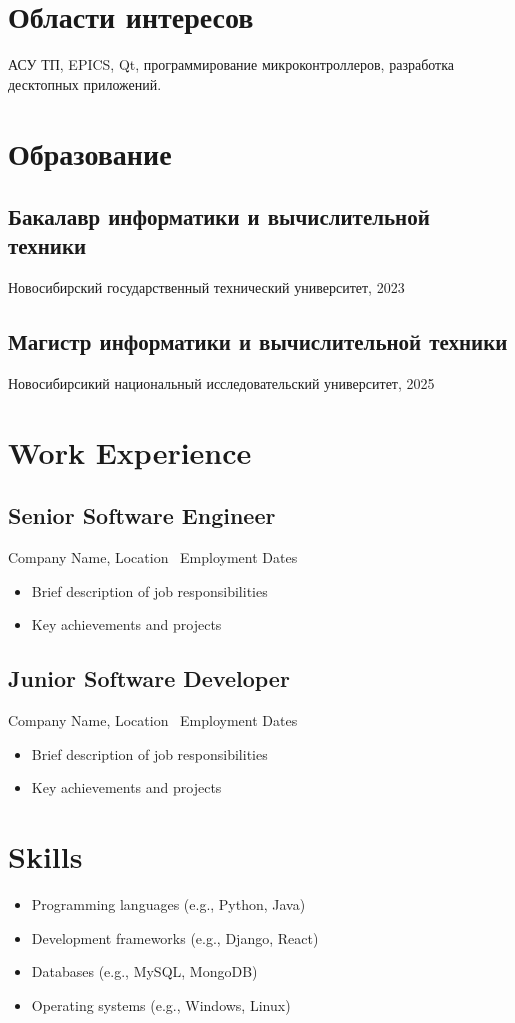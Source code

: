 \documentclass[12pt,a4paper]{article}
\begin{document}
\setlength{\columnsep}{1 cm}
\begin{multicols}{2}[\vskip 1cm]
\section*{Области интересов} 
АСУ ТП, EPICS, Qt, программирование микроконтроллеров, разработка десктопных приложений.
\section*{Образование} \subsection*{Бакалавр информатики и вычислительной техники} Новосибирский государственный технический университет, 2023\\
\subsection*{Магистр информатики и вычислительной техники} 
Новосибирсикий национальный исследовательский университет, 2025\\
\section*{Work Experience} \subsection*{Senior Software Engineer} Company Name, Location \ Employment Dates \ \begin{itemize} \item Brief description of job responsibilities \item Key achievements and projects \end{itemize}
\subsection*{Junior Software Developer} Company Name, Location \ Employment Dates \ \begin{itemize} \item Brief description of job responsibilities \item Key achievements and projects \end{itemize}

\section*{Skills} \begin{itemize} \item Programming languages (e.g., Python, Java) \item Development frameworks (e.g., Django, React) \item Databases (e.g., MySQL, MongoDB) \item Operating systems (e.g., Windows, Linux) \end{itemize}


\end{multicols}
\end{document}
